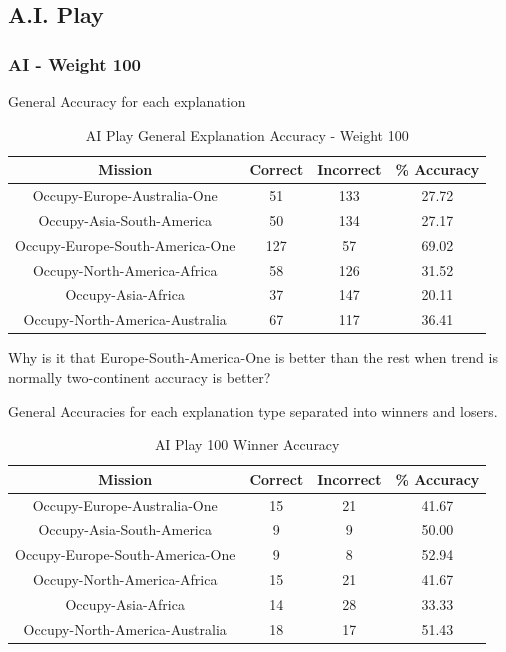 \documentclass[parskip]{cs4rep}
\begin{document}
\newpage

\subsection{A.I. Play}

\subsubsection{AI - Weight 100}

General Accuracy for each explanation

\begin{table}[ht]
\centering
\begin{tabular}{|c|c|c|c|}
\hline 
\textbf{Mission} & \textbf{Correct} & \textbf{Incorrect} & \textbf{\% Accuracy} \\ 
\hline 
Occupy-Europe-Australia-One & 51 & 133 & 27.72 \\  
\hline 
Occupy-Asia-South-America & 50 & 134 & 27.17 \\ 
\hline
Occupy-Europe-South-America-One & 127 & 57 & 69.02 \\
\hline
Occupy-North-America-Africa & 58 & 126 & 31.52 \\
\hline
Occupy-Asia-Africa & 37 & 147 & 20.11 \\
\hline
Occupy-North-America-Australia & 67 & 117 & 36.41 \\
\hline
\end{tabular}
\caption{AI Play General Explanation Accuracy - Weight 100}
\label{table:ai-100-general-accuracy}
\end{table}

Why is it that Europe-South-America-One is better than the rest when trend is normally two-continent accuracy is better?

General Accuracies for each explanation type separated into winners and losers.

\begin{table}[ht]
\centering
\begin{tabular}{|c|c|c|c|}
\hline 
\textbf{Mission} & \textbf{Correct} & \textbf{Incorrect} & \textbf{\% Accuracy} \\ 
\hline 
Occupy-Europe-Australia-One & 15 & 21 & 41.67 \\  
\hline 
Occupy-Asia-South-America & 9 & 9 & 50.00 \\ 
\hline
Occupy-Europe-South-America-One & 9 & 8 & 52.94 \\
\hline
Occupy-North-America-Africa & 15 & 21 & 41.67 \\
\hline
Occupy-Asia-Africa & 14 & 28 & 33.33 \\
\hline
Occupy-North-America-Australia & 18 & 17 & 51.43 \\
\hline
\end{tabular}
\caption{AI Play 100 Winner Accuracy}
\label{table:ai-100-winner-accuracy}
\end{table}
			
\end{document}
